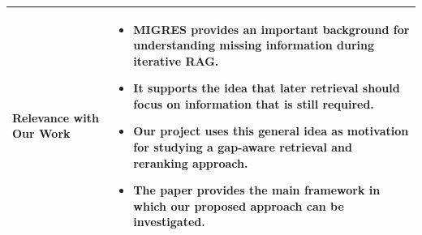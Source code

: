 \documentclass[12pt,a4paper]{report}
\begin{document}
\begin{longtable}{|p{1.25in}|p{5.15in}|}
\textbf{Relevance with Our Work} &
\begin{itemize}[leftmargin=0.18in,itemsep=0.05in,topsep=0pt,parsep=0pt]
\item MIGRES provides an important background for understanding missing information during iterative RAG.
\item It supports the idea that later retrieval should focus on information that is still required.
\item Our project uses this general idea as motivation for studying a gap-aware retrieval and reranking approach.
\item The paper provides the main framework in which our proposed approach can be investigated.
\end{itemize} \\ \hline
\end{longtable}
\clearpage
\end{document}
